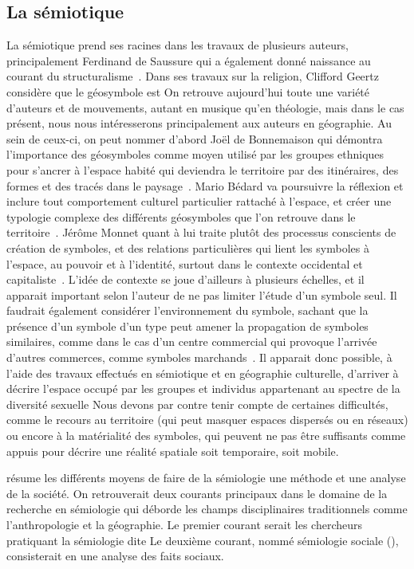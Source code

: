 \subsection{La sémiotique}
\label{ssub:la_semiotique}

La sémiotique prend ses racines dans les travaux de plusieurs auteurs, principalement Ferdinand de Saussure qui a également donné naissance au courant du structuralisme~\citep{Noth1995}.
Dans ses travaux sur la religion, Clifford Geertz considère que le géosymbole est
On retrouve aujourd'hui toute une variété d'auteurs et de mouvements, autant en musique qu'en théologie, mais dans le cas présent, nous nous intéresserons principalement aux auteurs en géographie.
Au sein de ceux-ci, on peut nommer d'abord Joël de Bonnemaison qui démontra l'importance des géosymboles comme moyen utilisé par les groupes ethniques pour s'ancrer à l'espace habité qui deviendra le territoire par des itinéraires, des formes et des tracés dans le paysage~\citep{Bonnemaison1981}.
Mario Bédard va poursuivre la réflexion et inclure tout comportement culturel particulier rattaché à l'espace, et créer une typologie complexe des différents géosymboles que l'on retrouve dans le territoire~\citep{Bedard2002}.
Jérôme Monnet quant à lui traite plutôt des processus conscients de création de symboles, et des relations particulières qui lient les symboles à l'espace, au pouvoir et à l'identité, surtout dans le contexte occidental et capitaliste~\citep{Monnet1998}.
L'idée de contexte se joue d'ailleurs à plusieurs échelles, et il apparait important selon l'auteur de ne pas limiter l'étude d'un symbole seul.
Il faudrait également considérer l'environnement du symbole, sachant que la présence d'un symbole d'un type peut amener la propagation de symboles similaires, comme dans le cas d'un centre commercial qui provoque l'arrivée d'autres commerces, comme symboles marchands~\citep[7-8]{Monnet1998}.
Il apparait donc possible, à l'aide des travaux effectués en sémiotique et en géographie culturelle, d'arriver à décrire l'espace occupé par les groupes et individus appartenant au spectre de la diversité sexuelle
Nous devons par contre tenir compte de certaines difficultés, comme le recours au territoire (qui peut masquer espaces dispersés ou en réseaux) ou encore à la matérialité des symboles, qui peuvent ne pas être suffisants comme appuis pour décrire une réalité spatiale soit temporaire, soit mobile.

\citet[105--109]{Rose2012} résume les différents moyens de faire de la sémiologie une méthode et une analyse de la société.
On retrouverait deux courants principaux dans le domaine de la recherche en sémiologie qui déborde les champs disciplinaires traditionnels comme l'anthropologie et la géographie.
Le premier courant serait les chercheurs pratiquant la sémiologie dite
Le deuxième courant, nommé sémiologie sociale (), consisterait en une analyse des faits sociaux.

